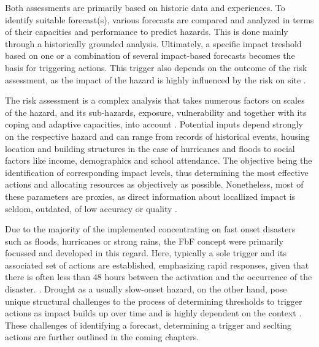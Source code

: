 {


Both assessments are primarily based on historic data and experiences. To identify suitable forecast(s), various forecasts are compared and analyzed in terms of their capacities and performance to predict hazards. This is done mainly through a historically grounded analysis. Ultimately, a specific impact treshold based on one or a combination of several impact-based forecasts becomes the basis for triggering actions. This trigger also depends on the outcome of the risk assessment, as the impact of the hazard is highly influenced by the risk on site \autocite{ifrcFbFPractitionersManual2023,ifrcForecastbasedFinancingNew2019}.

The risk assessment is a complex analysis that takes numerous factors on scales of the hazard, and its sub-hazards, exposure, vulnerability and together with its coping and adaptive capacities, into account \autocite{ifrcFbFPractitionersManual2023}. Potential inputs depend strongly on the respective hazard and can range from records of historical events, housing location and building structures in the case of hurricanes and floods to social factors like income, demographics and school attendance. The objective being the identification of corresponding impact levels, thus determining the most effective actions and allocating resources as objectively as possible. Nonetheless, most of these parameters are proxies, as direct information about locallized impact is seldom, outdated, of low accuracy or quality \autocite{ifrcFbFPractitionersManual2023}.

Due to the majority of the implemented  concentrating on fast onset disasters such as floods, hurricanes or strong rains, the FbF concept were primarily focussed and developed in this regard. Here, typically a sole trigger and its associated set of actions are established, emphasizing rapid responses, given that there is often less than 48 hours between the activation and the occurrence of the disaster. \autocite{rcrcFORECASTBASEDFINANCINGEARLY2020}. Drought as a usually slow-onset hazard, on the other hand, pose unique structural challenges to the process of determining thresholds to trigger actions as impact builds up over time and is highly dependent on the context \autocite{boultDroughtImpactbasedForecasting2022}. These challenges of identifying a forecast, determining a trigger and seclting actions are further outlined in the coming chapters.

}
